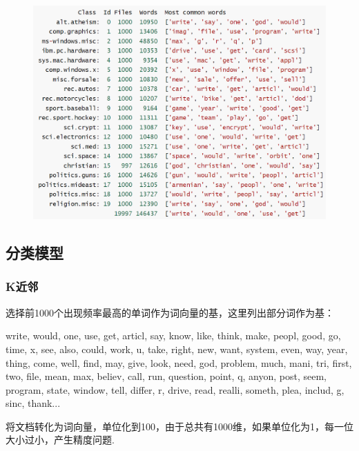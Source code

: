 \documentclass[12pt, a4paper, oneside]{ctexart}
\numberwithin{equation}{section}  %
\newcounter{problem}  %
\begin{document}
\begin{figure}[htbp]
    \hspace*{-1.2cm}
    \includegraphics[scale=0.5]{训练集相关信息.png}
\end{figure}

\subsection{分类模型}
\subsubsection{K近邻}
选择前1000个出现频率最高的单词作为词向量的基，这里列出部分词作为基：

\begin{pythoncode}
write, would, one, use, get, articl, say, know, like, think, make, peopl, good, go, time, x, see, also, could, work, u, take, right, new, want, system, even, way, year, thing, come, well, find, may, give, look, need, god, problem, much, mani, tri, first, two, file, mean, max, believ, call, run, question, point, q, anyon, post, seem, program, state, window, tell, differ, r, drive, read, realli, someth, plea, includ, g, sinc, thank...
\end{pythoncode}

将文档转化为词向量，单位化到100，由于总共有1000维，如果单位化为1，每一位大小过小，产生精度问题.
\end{document}
